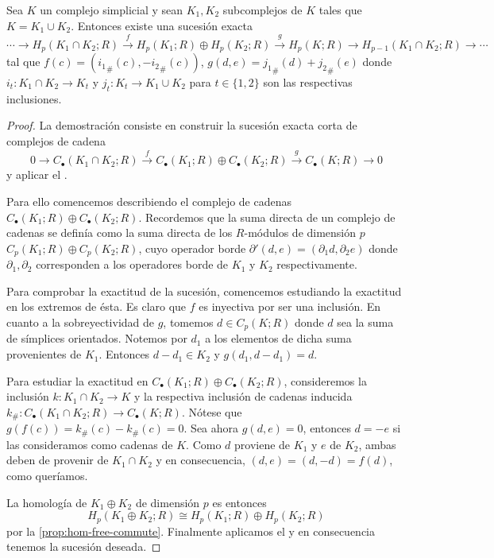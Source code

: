 \begin{proposicion}
	Sea $K$ un complejo simplicial y sean $K_1,K_2$ subcomplejos de $K$ tales que $K = K_1 \cup K_2$. Entonces existe una sucesión exacta
	\[
		\cdots \to H_p(K_1 \cap K_2;R) \overset{f}{\to} H_p(K_1;R) \oplus H_p(K_2;R) \overset{g}{\to} H_p(K;R) \to H_{p-1}(K_1 \cap K_2;R) \to \cdots
	\]
	tal que $f(c) = ({i_1}_\#(c),-{i_2}_\#(c))$, $g(d,e) = {j_1}_\#(d)+{j_2}_\#(e)$ donde $i_t: K_1 \cap K_2 \to K_t$ y $j_t: K_t \to K_1 \cup K_2$ para $t \in \{1,2\}$ son las respectivas inclusiones.
\end{proposicion}
\begin{proof}
	La demostración consiste en construir la sucesión exacta corta de complejos de cadena
	\[
		0 \to C_{\bullet}(K_1 \cap K_2;R) \overset{f}{\to} C_{\bullet}(K_1;R) \oplus C_{\bullet}(K_2;R) \overset{g}{\to} C_{\bullet}(K;R) \to 0
	\]
	y aplicar el .
	
	Para ello comencemos describiendo el complejo de cadenas $C_{\bullet}(K_1;R) \oplus C_{\bullet}(K_2;R)$. Recordemos que la suma directa de un complejo de cadenas se definía como la suma directa de los $R$-módulos de dimensión $p$ $C_p(K_1;R) \oplus C_p(K_2;R)$, cuyo operador borde $\partial'(d,e) = (\partial_1d, \partial_2 e)$ donde $\partial_1, \partial_2$ corresponden a los operadores borde de $K_1$ y $K_2$ respectivamente.
	
	Para comprobar la exactitud de la sucesión,  comencemos estudiando la exactitud en los extremos de ésta. Es claro que $f$ es inyectiva por ser una inclusión. En cuanto a la sobreyectividad de $g$, tomemos $d \in C_p(K;R)$ donde $d$ sea la suma de símplices orientados. Notemos por $d_1$ a los elementos de dicha suma provenientes de $K_1$. Entonces $d - d_1 \in K_2$ y $g(d_1, d-d_1) = d$.
	
	Para estudiar la exactitud en $C_{\bullet}(K_1;R) \oplus C_{\bullet}(K_2;R)$, consideremos la inclusión $k: K_1 \cap K_2 \to K$ y la respectiva inclusión de cadenas inducida $k_\#: C_{\bullet}(K_1 \cap K_2;R) \to C_{\bullet}(K;R)$. Nótese que $g(f(c)) = k_\#(c) - k_\#(c) = 0$. Sea ahora $g(d,e) = 0$, entonces $d = -e$ si las consideramos como cadenas de $K$. Como $d$ proviene de $K_1$ y $e$ de $K_2$, ambas deben de provenir de $K_1 \cap K_2$ y en consecuencia, $(d,e) = (d,-d) = f(d)$, como queríamos.
	
	La homología de $K_1 \oplus K_2$ de dimensión $p$ es entonces
	\[
		H_p(K_1 \oplus K_2;R) \cong H_p(K_1;R) \oplus H_p(K_2;R)
	\]
	por la \autoref{prop:hom-free-commute}. Finalmente aplicamos el  y en consecuencia tenemos la sucesión deseada.
	

\end{proof}
